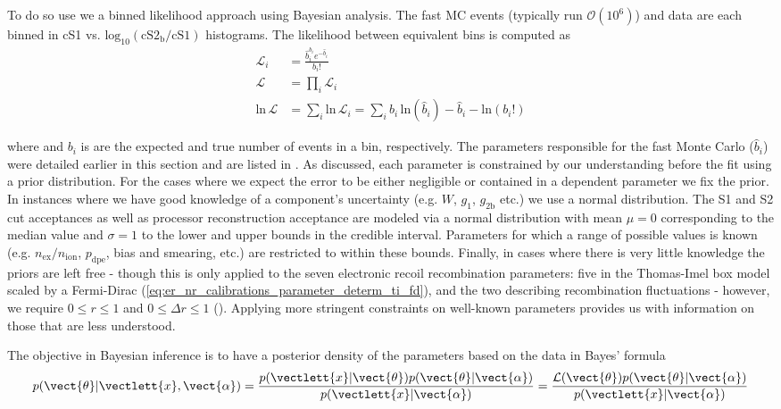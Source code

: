 To do so use we a binned likelihood approach using Bayesian analysis.  The fast MC events (typically run $\mathcal{O}(10^6)$) and data are
each binned in cS1 vs. $\mathrm{log_{10}(cS2_b / cS1)}$ histograms.  The likelihood between equivalent bins \li is computed as
\begin{equation}
\begin{aligned}
\mathcal{L}_i &=\frac{\hat{b}_{i}^{b_i} e^{-\hat{b}_{i}}}{b_{i}!} \\
\mathcal{L} &= \prod_i \mathcal{L}_i \\
\mathrm{ln}\, \mathcal{L} &= \sum_i \mathrm{ln}\, \mathcal{L}_i = \sum_i b_i\, \mathrm{ln} (\hat{b}_i) - \hat{b}_i - \mathrm{ln} (b_i !)
\end{aligned}
\end{equation}

\noindent where \bhi and $b_i$ is are the expected and true number of events in a bin, respectively.  The parameters responsible
for the fast Monte Carlo ($\hat{b}_i$) were detailed earlier in this section and are listed in
.  As discussed, each parameter is constrained by our understanding before
the fit using a prior distribution.  For the cases where we expect the error to be either negligible or contained in a dependent parameter
we fix the prior.  In instances where we have good knowledge of a component's uncertainty (e.g. $W$, $g_1$, $g_{2\mathrm{b}}$ etc.) we use
a normal
distribution.  The S1 and S2 cut acceptances as well as processor reconstruction acceptance are modeled via a normal distribution with
mean $\mu = 0$ corresponding to the median value and $\sigma = 1$ to the lower and upper bounds in the credible interval.  Parameters for
which a range of possible values is known (e.g. $n_{\mathrm{ex}} / n_{\mathrm{ion}}$, $p_{\mathrm{dpe}}$,
bias and smearing, etc.) are restricted to within these bounds.  Finally, in cases where there is very little knowledge the priors
are left free - though this is only applied to the seven electronic recoil recombination parameters: five in the Thomas-Imel box model
scaled by a Fermi-Dirac (\eqref{eq:er_nr_calibrations_parameter_determ_ti_fd}), and the two describing recombination
fluctuations - however, we require $0 \leq r \leq 1$ and $0 \leq \Delta r \leq 1$
().  Applying more stringent constraints on well-known parameters provides us
with information on those that are less understood.

The objective in Bayesian inference is to have a posterior density of the parameters based on the data in Bayes' formula
\begin{equation}
p(\vect{\theta}|\vectlett{x}, \vect{\alpha}) = \frac{p(\vectlett{x}|\vect{\theta})
p(\vect{\theta}|\vect{\alpha})}{p(\vectlett{x}|\vect{\alpha})} = \frac{\mathcal{L}(\vect{\theta})
p(\vect{\theta}|\vect{\alpha})}{p(\vectlett{x}|\vect{\alpha})}
\end{equation}

